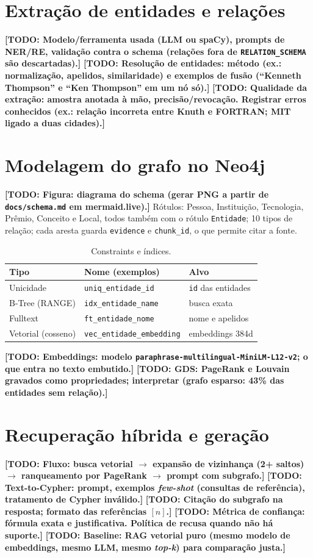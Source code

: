 \documentclass[12pt]{article}
\newcommand{\todo}[1]{\textbf{[TODO: #1]}}
\begin{document}
\section{Extração de entidades e relações} %
\todo{Modelo/ferramenta usada (LLM ou spaCy), prompts de NER/RE, validação contra o schema
(relações fora de \texttt{RELATION\_SCHEMA} são descartadas).}
\todo{Resolução de entidades: método (ex.: normalização, apelidos, similaridade) e exemplos de fusão
(``Kenneth Thompson'' e ``Ken Thompson'' em um nó só).}
\todo{Qualidade da extração: amostra anotada à mão, precisão/revocação. Registrar erros conhecidos
(ex.: relação incorreta entre Knuth e FORTRAN; MIT ligado a duas cidades).}

\section{Modelagem do grafo no Neo4j} %
\todo{Figura: diagrama do schema (gerar PNG a partir de \texttt{docs/schema.md} em mermaid.live).}
Rótulos: Pessoa, Instituição, Tecnologia, Prêmio, Conceito e Local, todos também com o rótulo \texttt{Entidade};
10 tipos de relação; cada aresta guarda \texttt{evidence} e \texttt{chunk\_id}, o que permite citar a fonte.

\begin{table}[h]\centering\caption{Constraints e índices.}
\begin{tabular}{lll}\toprule
Tipo & Nome (exemplos) & Alvo \\\midrule
Unicidade & \texttt{uniq\_entidade\_id} & \texttt{id} das entidades \\
B-Tree (RANGE) & \texttt{idx\_entidade\_name} & busca exata \\
Fulltext & \texttt{ft\_entidade\_nome} & nome e apelidos \\
Vetorial (cosseno) & \texttt{vec\_entidade\_embedding} & embeddings 384d \\\bottomrule
\end{tabular}\end{table}

\todo{Embeddings: modelo \texttt{paraphrase-multilingual-MiniLM-L12-v2}; o que entra no texto embutido.}
\todo{GDS: PageRank e Louvain gravados como propriedades; interpretar (grafo esparso: 43\% das entidades sem relação).}

\section{Recuperação híbrida e geração} %
\todo{Fluxo: busca vetorial $\to$ expansão de vizinhança (2+ saltos) $\to$ ranqueamento por PageRank $\to$ prompt com subgrafo.}
\todo{Text-to-Cypher: prompt, exemplos \emph{few-shot} (consultas de referência), tratamento de Cypher inválido.}
\todo{Citação do subgrafo na resposta; formato das referências $[n]$.}
\todo{Métrica de confiança: fórmula exata e justificativa. Política de recusa quando não há suporte.}
\todo{Baseline: RAG vetorial puro (mesmo modelo de embeddings, mesmo LLM, mesmo \emph{top-k}) para comparação justa.}
\end{document}
